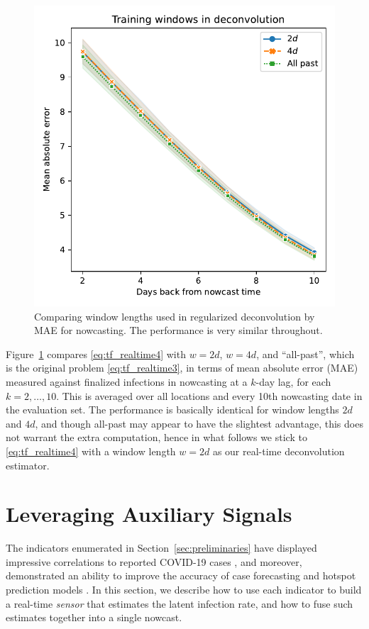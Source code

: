 \documentclass[sts]{imsart}
\theoremstyle{plain}
\theoremstyle{definition}
\theoremstyle{remark}
\begin{document}
\begin{figure}[tb]
\centering
\includegraphics[width=0.825\linewidth]{./figures/deconvolution_window_05_small_square.pdf}
\caption{Comparing window lengths used in regularized deconvolution by
  MAE for nowcasting. The performance is very similar throughout.}
\label{fig:deconvolution_window}
\end{figure}

Figure~\ref{fig:deconvolution_window} compares \eqref{eq:tf_realtime4} with
$w=2d$, $w=4d$, and ``all-past'', which is the original problem
\eqref{eq:tf_realtime3}, in terms of mean absolute error (MAE) measured against
finalized infections in nowcasting at a $k$-day lag, for each
$k=2,\ldots,10$. This is averaged over all locations and every 10th nowcasting
date in the evaluation set. The performance is basically identical for window
lengths $2d$ and $4d$, and though all-past may appear to have the slightest 
advantage, this does not warrant the extra computation, hence in what follows
we stick to \eqref{eq:tf_realtime4} with a window length $w=2d$ as our
real-time deconvolution estimator.    

\section{Leveraging Auxiliary Signals}
\label{sec:leverage_aux}

The indicators enumerated in Section~\ref{sec:preliminaries} have displayed
impressive correlations to reported COVID-19 cases \citep{Reinhart:2021}, and
moreover, demonstrated an ability to improve the accuracy of case forecasting
and hotspot prediction models \citep{McDonald:2021}. In this section, we
describe how to use each indicator to build a real-time \emph{sensor} that
estimates the latent infection rate, and how to fuse such estimates together
into a single nowcast.
\end{document}
